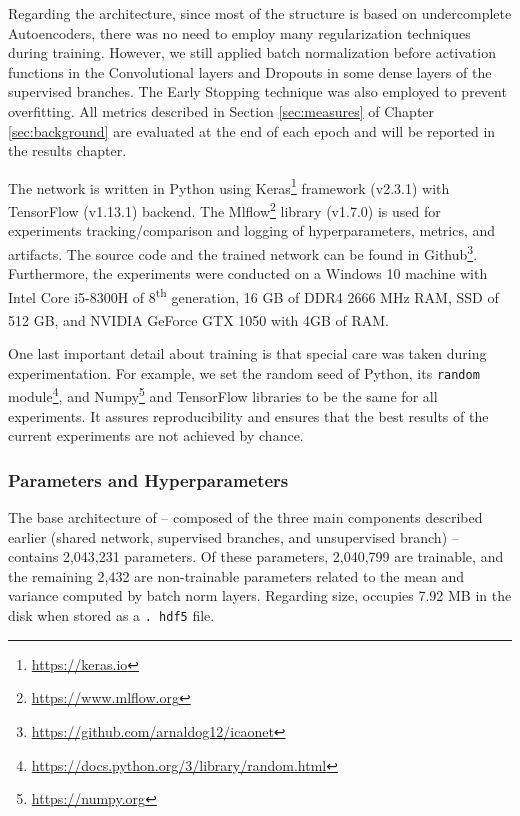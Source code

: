 Regarding the architecture, since most of the \methodname structure is based on undercomplete Autoencoders, there was no need to employ many regularization techniques during training. However, we still applied batch normalization before activation functions in the Convolutional layers and Dropouts in some dense layers of the supervised branches. The Early Stopping technique was also employed to prevent overfitting. All metrics described in Section \ref{sec:measures} of Chapter \ref{sec:background} are evaluated at the end of each epoch and will be reported in the results chapter.
 
The network is written in Python using Keras\footnote{\url{https://keras.io}} framework (v2.3.1) with TensorFlow (v1.13.1) backend. The Mlflow\footnote{\url{https://www.mlflow.org}} library (v1.7.0) is used for experiments tracking/comparison and logging of hyperparameters, metrics, and artifacts. The source code and the trained network can be found in Github\footnote{\url{https://github.com/arnaldog12/icaonet}}. Furthermore, the experiments were conducted on a Windows 10 machine with Intel\textsuperscript{\tiny\textregistered} Core\textsuperscript{\tiny\texttrademark} i5-8300H of 8\textsuperscript{th} generation, 16 GB of DDR4 2666 MHz RAM, SSD of 512 GB, and NVIDIA\textsuperscript{\tiny\textregistered} GeForce\textsuperscript{\tiny\textregistered} GTX 1050 with 4GB of RAM.
 
One last important detail about \methodname training is that special care was taken during experimentation. For example, we set the random seed of Python, its \texttt{random} module\footnote{\url{https://docs.python.org/3/library/random.html}}, and Numpy\footnote{\url{https://numpy.org}} and TensorFlow libraries to be the same for all experiments. It assures reproducibility and ensures that the best results of the current experiments are not achieved by chance.
 
\subsubsection{Parameters and Hyperparameters} \label{sec:hyperparams}
 
The base architecture of \methodname -- composed of the three main components described earlier (shared network, supervised branches, and unsupervised branch) -- contains 2,043,231 parameters. Of these parameters, 2,040,799 are trainable, and the remaining 2,432 are non-trainable parameters related to the mean and variance computed by batch norm layers. Regarding size, \methodname occupies 7.92 MB in the disk when stored as a \texttt{. hdf5} file.
 

